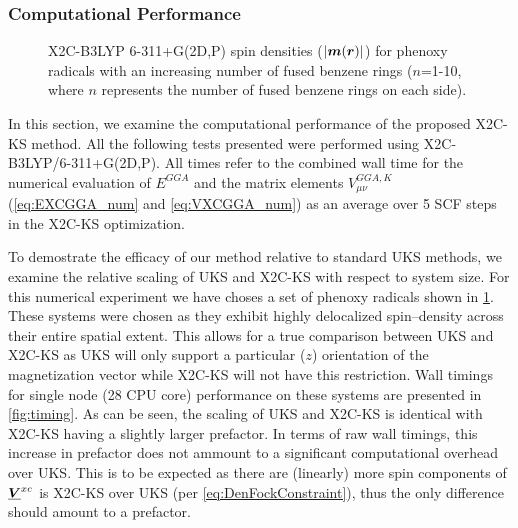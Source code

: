 \subsubsection{Computational Performance}

\begin{figure}
\begin{center}
\end{center}
\caption{X2C-B3LYP 6-311+G(2D,P) spin densities ($\vert\boldsymbol{m}(\boldsymbol{r})\vert$) for phenoxy radicals with an increasing number of fused benzene rings 
($n$=1-10, where $n$ represents the number of fused benzene rings on each side).}
\label{fig:radicals}       
\end{figure}

In this section, we examine the computational performance of the proposed
X2C-KS method.  All the following tests presented were performed using
X2C-B3LYP/6-311+G(2D,P).  All times refer to the combined wall time for the
numerical evaluation of $ E^{GGA}$ and the matrix elements
$V^{GGA,K}_{\mu\nu}$ (\cref{eq:EXCGGA_num} and \cref{eq:VXCGGA_num}) as an
average over 5 SCF steps in the X2C-KS optimization.  

To demostrate the efficacy of our method relative to standard UKS methods,
we examine the relative scaling of UKS and X2C-KS with respect to system
size. For this numerical experiment we have choses a set of phenoxy radicals
shown in \cref{fig:radicals}. These systems were chosen as they exhibit highly
delocalized spin--density across their entire spatial extent. This allows for
a true comparison between UKS and X2C-KS as UKS will only support a particular
($z$) orientation of the magnetization vector while X2C-KS will not have this
restriction. Wall timings for single node (28 CPU core) performance on these systems are presented in \cref{fig:timing}.
As can be seen, the scaling of UKS and X2C-KS is identical with X2C-KS
having a slightly larger prefactor. In terms of raw wall timings, this increase in prefactor
does not ammount to a significant computational overhead over UKS. This is to be expected as there are (linearly)
more spin components of $\boldsymbol{\underline{V}}^{xc}$ is X2C-KS over UKS (per \cref{eq:DenFockConstraint}),
thus the only difference should amount to a prefactor.




